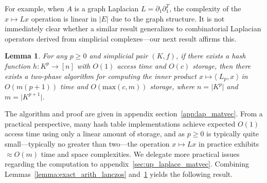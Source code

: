 \documentclass[10pt]{article}
\numberwithin{equation}{section}
\newcommand{\+}{%
	\raisebox{0.18ex}{\scaleobj{0.55}{+}}
}
\newtheorem{lemma}{Lemma}
\theoremstyle{definition}
\theoremstyle{definition}
\begin{document}
For example, when $A$ is a graph Laplacian $L = \partial_1 \partial_1^T$, the complexity of the $x \mapsto L x$ operation is linear in $\lvert E \rvert$ due to the graph structure.
It is not immediately clear whether a similar result generalizes to combinatorial Laplacian operators derived from simplicial complexes---our next result affirms this.
\begin{lemma}\label{lemma:matvec_lap}
	For any $p \geq 0$ and simplicial pair $(K, f)$, if there exists a hash function $h: K^p \to [n]$ with $O(1)$ access time and $O(c)$ storage, then there exists a two-phase algorithm for computing the inner product $x \mapsto \langle \; L_p, x	\; \rangle$ in $O(m(p+1))$ time and $O(\mathrm{max}(c,m))$ storage, where $n = \lvert K^p \rvert$ and $m = \lvert K^{p+1} \rvert$. 
\end{lemma}
\noindent The algorithm and proof are given in appendix section~\ref{app:lap_matvec}. From a practical perspective, many hash table implementations achieve expected $O(1)$ access time using only a linear amount of storage, and as $p \geq 0$ is typically quite small---typically no greater than two---the operation $x \mapsto L x$ in practice exhibits $\approx O(m)$ time and space complexities. 
We delegate more practical issues regarding the computation to appendix~\ref{sec:up_laplace_matvec}.
Combining Lemmas~\ref{lemma:exact_arith_lanczos} and~\ref{lemma:matvec_lap} yields the following result. 
\end{document}
